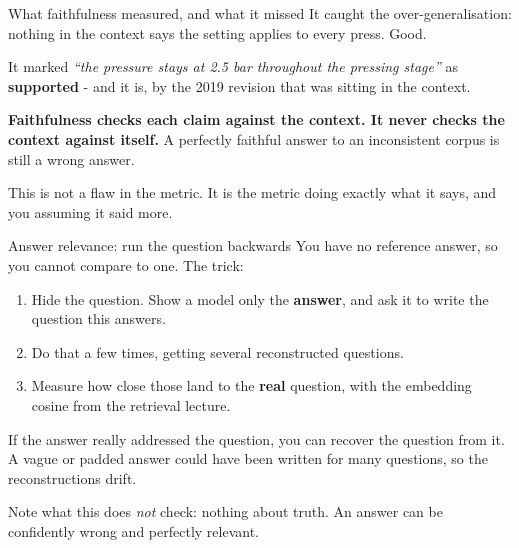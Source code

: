 \documentclass[aspectratio=169]{beamer}
\newcommand{\keybox}[1]{%
  \begin{tcolorbox}[colback=armblue!8, colframe=armblue, boxrule=0.6pt, arc=2pt]
  #1
  \end{tcolorbox}}
\newcommand{\trapbox}[1]{%
  \begin{tcolorbox}[colback=armred!8, colframe=armred, boxrule=0.6pt, arc=2pt]
  #1
  \end{tcolorbox}}
\begin{document}
\begin{frame}{What faithfulness measured, and what it missed}
  \vspace{0.7em}
  It caught the over-generalisation: nothing in the context says the setting applies to
  every press. Good.

  \vspace{0.9em}
  It marked \textit{``the pressure stays at 2.5 bar throughout the pressing stage''} as
  \textbf{supported} - and it is, by the 2019 revision that was sitting in the context.

  \vspace{1.0em}
  \trapbox{\textbf{Faithfulness checks each claim against the context. It never checks the
  context against itself.} A perfectly faithful answer to an inconsistent corpus is still a
  wrong answer.}

  \vspace{0.9em}
  \begin{center}
  {\small\color{gray}This is not a flaw in the metric. It is the metric doing exactly what
  it says, and you assuming it said more.}
  \end{center}
\end{frame}

\begin{frame}{Answer relevance: run the question backwards}
  \vspace{0.7em}
  You have no reference answer, so you cannot compare to one. The trick:

  \vspace{0.8em}
  \begin{enumerate}
    \item[\textbf{1.}] Hide the question. Show a model only the \textbf{answer}, and ask it
      to write the question this answers.
    \item[\textbf{2.}] Do that a few times, getting several reconstructed questions.
    \item[\textbf{3.}] Measure how close those land to the \textbf{real} question, with the
      embedding cosine from the retrieval lecture.
  \end{enumerate}

  \vspace{1.0em}
  \keybox{If the answer really addressed the question, you can recover the question from
  it. A vague or padded answer could have been written for many questions, so the
  reconstructions drift.}

  \vspace{0.7em}
  {\small Note what this does \emph{not} check: nothing about truth. An answer can be
  confidently wrong and perfectly relevant.}
\end{frame}
\end{document}
